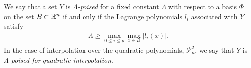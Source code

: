 We say that a set $Y$ is \emph{$\Lambda$-poised} for a fixed constant $\Lambda$ with respect to a basis $\Phi$ on the set 
$B \subset\mathbb R^n$ if and only if the Lagrange polynomials $l_i$ associated with $Y$ satisfy
\begin{align}
\Lambda \ge \max_{0\le i\le p}\max_{x\in B}|l_i(x)|.
\end{align}
In the case of interpolation over the quadratic polynomials, 
$ \mathcal{P}^2_n$, we say that $Y$ is \emph{$\Lambda$-poised for quadratic interpolation}.



% 
% 

